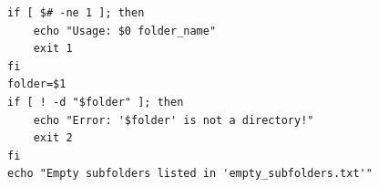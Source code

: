 \begin{verbatim}
if [ $# -ne 1 ]; then
    echo "Usage: $0 folder_name"
    exit 1
fi
folder=$1
if [ ! -d "$folder" ]; then
    echo "Error: '$folder' is not a directory!"
    exit 2
fi
echo "Empty subfolders listed in 'empty_subfolders.txt'"
\end{verbatim}